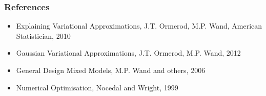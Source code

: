 \documentclass{beamer}
\begin{document}
\begin{frame}
	\frametitle{References}
	\begin{itemize}
		\item Explaining Variational Approximations, J.T. Ormerod, M.P. Wand, American Statistician, 2010
		\item Gaussian Variational Approximations, J.T. Ormerod, M.P. Wand, 2012
		\item General Design Mixed Models, M.P. Wand and others, 2006
		\item Numerical Optimisation, Nocedal and Wright, 1999
	\end{itemize}
\end{frame}
\end{document}

